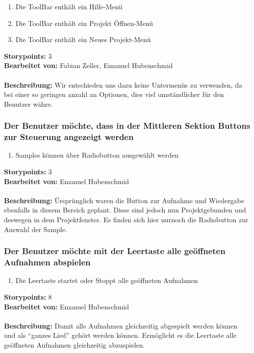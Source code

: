 \begin{enumerate}
 \item Die ToolBar enthält ein Hilfe-Menü
 \item Die ToolBar enthält ein Projekt Öffnen-Menü
 \item Die ToolBar enthält ein Neues Projekt-Menü
\end{enumerate}

\textbf{Storypoints:} 3 \\
\textbf{Bearbeitet von:} Fabian Zeller, Emanuel Hubenschmid \\
\\
\textbf{Beschreibung:} Wir entschieden uns dazu keine Untermenüs zu verwenden, da bei einer so 
geringen anzahl an Optionen, dies viel umständlicher für den Benutzer währe.


\subsubsection{Der Benutzer möchte, dass in der Mittleren Sektion Buttons zur Steuerung angezeigt 
werden}

\begin{enumerate}
 \item Samples können über Radiobutton ausgewählt werden
\end{enumerate}

\textbf{Storypoints:} 3 \\
\textbf{Bearbeitet von:} Emanuel Hubenschmid \\
\\
\textbf{Beschreibung:} Ürsprünglich waren die Button zur Aufnahme und Wiedergabe ebenfalls in 
diesem Bereich geplant. Diese sind jedoch nun Projektgebunden und deswegen in dem Projektfenster. 
Es finden sich hier nurnoch die Radiobutton zur Auswahl der Sample.


\subsubsection{Der Benutzer möchte mit der Leertaste alle geöffneten Aufnahmen abspielen}

\begin{enumerate}
 \item Die Leertaste startet oder Stoppt alle geöffneten Aufnahmen
\end{enumerate}

\textbf{Storypoints:} 8 \\
\textbf{Bearbeitet von:} Emanuel Hubenschmid \\
\\
\textbf{Beschreibung:} Damit alle Aufnahmen gleichzeitig abgespielt werden können und als ``ganzes 
Lied'' gehört werden können. Ermöglicht es die Leertaste alle geöffneten Aufnahmen gleichzeitig 
abzuspielen.



